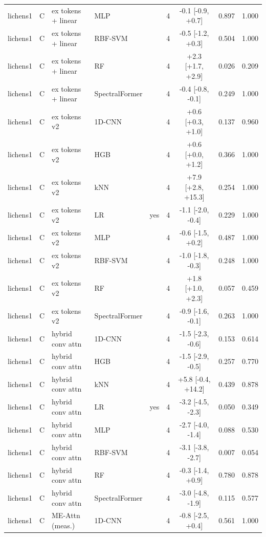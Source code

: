 \begin{tabular}{lllllcccc}
lichens1 & C & ex tokens + linear & MLP &  & 4 & -0.1 [-0.9, +0.7] & 0.897 & 1.000 \\
lichens1 & C & ex tokens + linear & RBF-SVM &  & 4 & -0.5 [-1.2, +0.3] & 0.504 & 1.000 \\
lichens1 & C & ex tokens + linear & RF &  & 4 & +2.3 [+1.7, +2.9] & 0.026 & 0.209 \\
lichens1 & C & ex tokens + linear & SpectralFormer &  & 4 & -0.4 [-0.8, -0.1] & 0.249 & 1.000 \\
lichens1 & C & ex tokens v2 & 1D-CNN &  & 4 & +0.6 [+0.3, +1.0] & 0.137 & 0.960 \\
lichens1 & C & ex tokens v2 & HGB &  & 4 & +0.6 [+0.0, +1.2] & 0.366 & 1.000 \\
lichens1 & C & ex tokens v2 & kNN &  & 4 & +7.9 [+2.8, +15.3] & 0.254 & 1.000 \\
lichens1 & C & ex tokens v2 & LR & yes & 4 & -1.1 [-2.0, -0.4] & 0.229 & 1.000 \\
lichens1 & C & ex tokens v2 & MLP &  & 4 & -0.6 [-1.5, +0.2] & 0.487 & 1.000 \\
lichens1 & C & ex tokens v2 & RBF-SVM &  & 4 & -1.0 [-1.8, -0.3] & 0.248 & 1.000 \\
lichens1 & C & ex tokens v2 & RF &  & 4 & +1.8 [+1.0, +2.3] & 0.057 & 0.459 \\
lichens1 & C & ex tokens v2 & SpectralFormer &  & 4 & -0.9 [-1.6, -0.1] & 0.263 & 1.000 \\
lichens1 & C & hybrid conv attn & 1D-CNN &  & 4 & -1.5 [-2.3, -0.6] & 0.153 & 0.614 \\
lichens1 & C & hybrid conv attn & HGB &  & 4 & -1.5 [-2.9, -0.5] & 0.257 & 0.770 \\
lichens1 & C & hybrid conv attn & kNN &  & 4 & +5.8 [-0.4, +14.2] & 0.439 & 0.878 \\
lichens1 & C & hybrid conv attn & LR & yes & 4 & -3.2 [-4.5, -2.3] & 0.050 & 0.349 \\
lichens1 & C & hybrid conv attn & MLP &  & 4 & -2.7 [-4.0, -1.4] & 0.088 & 0.530 \\
lichens1 & C & hybrid conv attn & RBF-SVM &  & 4 & -3.1 [-3.8, -2.7] & 0.007 & 0.054 \\
lichens1 & C & hybrid conv attn & RF &  & 4 & -0.3 [-1.4, +0.9] & 0.780 & 0.878 \\
lichens1 & C & hybrid conv attn & SpectralFormer &  & 4 & -3.0 [-4.8, -1.9] & 0.115 & 0.577 \\
lichens1 & C & ME-Attn (meas.) & 1D-CNN &  & 4 & -0.8 [-2.5, +0.4] & 0.561 & 1.000 \\

\end{tabular}
